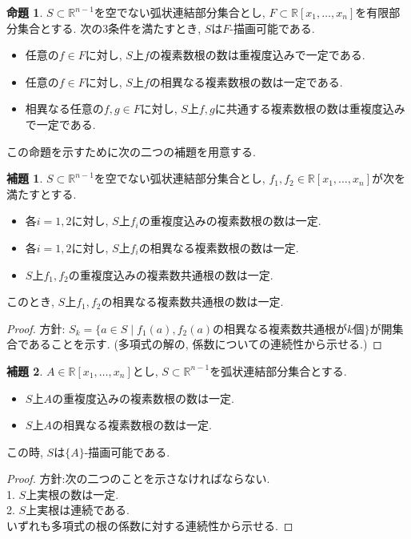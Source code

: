 \documentclass[dvipdfmx]{jsarticle}
\newcommand{\R}{\mathbb{R}}
\theoremstyle{definition}
\newtheorem{proposition}{命題}[section]
\newtheorem{lemma}{補題}[section]
\begin{document}
\begin{proposition}
$S \subset \R^{n-1}$を空でない弧状連結部分集合とし, $F \subset \R[x_1, \dots, x_n]$を有限部分集合とする.
次の3条件を満たすとき, $S$は$F$-描画可能である.
\begin{itemize}
\item 任意の$f \in F$に対し, $S$上$f$の複素数根の数は重複度込みで一定である.
\item 任意の$f \in F$に対し, $S$上$f$の相異なる複素数根の数は一定である.
\item 相異なる任意の$f, g \in F$に対し, $S$上$f, g$に共通する複素数根の数は重複度込みで一定である.
\end{itemize}
\end{proposition}

この命題を示すために次の二つの補題を用意する.

\begin{lemma}
$S \subset \R^{n-1}$を空でない弧状連結部分集合とし, $f_1, f_2 \in \R[x_1, \dots, x_n]$が次を満たすとする.
\begin{itemize}
\item 各$i=1,2$に対し, $S$上$f_i$の重複度込みの複素数根の数は一定.
\item 各$i=1,2$に対し, $S$上$f_i$の相異なる複素数根の数は一定.
\item $S$上$f_1, f_2$の重複度込みの複素数共通根の数は一定.
\end{itemize}
このとき, $S$上$f_1, f_2$の相異なる複素数共通根の数は一定.
\end{lemma}
\begin{proof}
方針: $S_k = \{a \in S \mid f_1(a), f_2(a)の相異なる複素数共通根がk個 \}$が開集合であることを示す. (多項式の解の, 係数についての連続性から示せる.)

\end{proof}

\begin{lemma}
$A \in \R[x_1, \dots, x_n]$とし, $S \subset \R^{n-1}$を弧状連結部分集合とする.
\begin{itemize}
\item $S$上$A$の重複度込みの複素数根の数は一定.
\item $S$上$A$の相異なる複素数根の数は一定.
\end{itemize}
この時, $S$は$\{A\}$-描画可能である.
\end{lemma}

\begin{proof}
方針:次の二つのことを示さなければならない.\\
1.  $S$上実根の数は一定.\\
2.  $S$上実根は連続である.\\
いずれも多項式の根の係数に対する連続性から示せる.
\end{proof}
\end{document}
